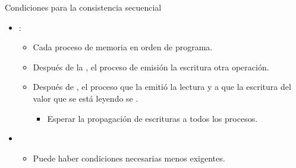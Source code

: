 \begin{frame}[t]{Condiciones para la consistencia secuencial}
\begin{itemize}
  \item {}:
    \begin{itemize}
      \item Cada proceso  de memoria en orden de programa.
      \item Después de la , 
            el proceso de emisión  la escritura 
             otra operación.
      \item Después de , el proceso que la emitió 
             la lectura y a que 
            la escritura del valor que se está leyendo se .
        \begin{itemize}
          \item Esperar la propagación de escrituras a todos los procesos.
        \end{itemize}
    \end{itemize}
  \item {}
    \begin{itemize}
      \item Puede haber condiciones necesarias menos exigentes.
    \end{itemize}

\end{itemize}
\end{frame}
